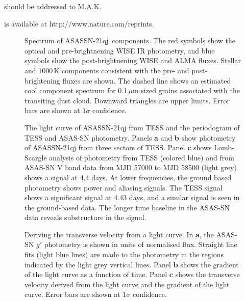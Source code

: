 \documentclass[sn-nature]{sn-jnl}%
\newcommand{\asas}{ASASSN-21qj}
\begin{document}

should be addressed to M.A.K.

 is available at http://www.nature.com/reprints.
\newpage

\clearpage

\begin{figure}
    \centering
    \caption{Spectrum of \asas{}~components. The red symbols show the optical and pre-brightnening WISE IR photometry, and blue symbols show the post-brightnening WISE and ALMA fluxes. Stellar and 1000\,K components consistent with the pre- and post-brightening fluxes are shown. The dashed line shows an estimated cool component spectrum for 0.1\,$\mu$m sized grains associated with the transiting dust cloud. Downward triangles are upper limits.
    Error bars are shown at $1\sigma$ confidence.
}
    \label{fig:sed}
\end{figure}
%


\begin{figure}
   \begin{centering}
      \caption{The light curve of ASASSN-21qj from TESS and the periodogram of TESS and ASAS-SN photometry.
      Panels {\bf a} and {\bf b} show photometry of ASASSN-21qj from three sectors of TESS.
      Panel {\bf c} shows Lomb-Scargle analysis of photometry from TESS (colored blue) and from ASAS-SN V band data from MJD 57000 to MJD 58500 (light grey) shows a signal at 4.4 days.
      At lower frequencies, the ground based photometry shows power and aliasing signals.
      The TESS signal shows a significant signal at 4.43 days, and a similar signal is seen in the ground-based data.
      The longer time baseline in the ASAS-SN data reveals substructure in the signal.}
        \label{fig:TESS_lc}
    \end{centering}
\end{figure}

\begin{figure*}
\begin{centering}
      \caption{Deriving the transverse velocity from a light curve.
      In {\bf a}, the ASAS-SN $g'$ photometry is shown in units of normalised flux.
      Straight line fits (light blue lines) are made to the photometry in the regions indicated by the light grey vertical lines.
      Panel {\bf b} shows the gradient of the light curve as a function of time.
      Panel {\bf c} shows the transverse velocity derived from the light curve and the gradient of the light curve.
      Error bars are shown at $1\sigma$ confidence.
}
        \label{fig:gradientconvert}
\end{centering}
\end{figure*}
\end{document}
